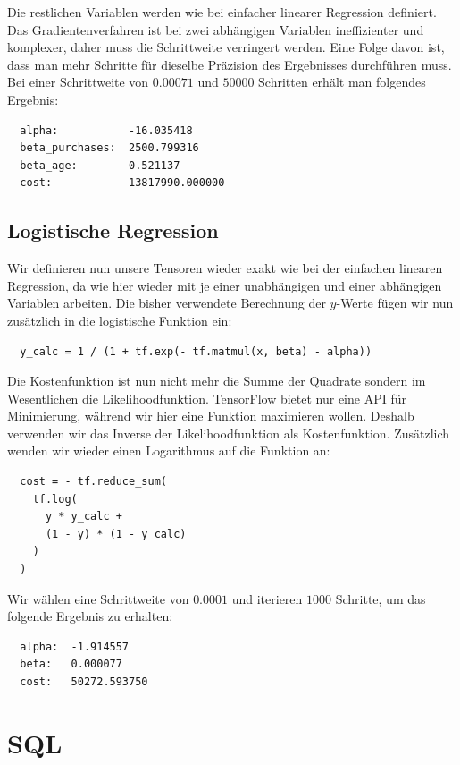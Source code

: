 Die restlichen Variablen werden wie bei einfacher linearer Regression definiert. Das Gradientenverfahren ist bei zwei abhängigen Variablen ineffizienter und komplexer, daher muss die Schrittweite verringert werden. Eine Folge davon ist, dass man mehr Schritte für dieselbe Präzision des Ergebnisses durchführen muss. Bei einer Schrittweite von $0.00071$ und $50000$ Schritten erhält man folgendes Ergebnis:

\begin{lstlisting}
  alpha:           -16.035418
  beta_purchases:  2500.799316
  beta_age:        0.521137
  cost:            13817990.000000
\end{lstlisting}

\subsection{Logistische Regression}

Wir definieren nun unsere Tensoren wieder exakt wie bei der einfachen linearen Regression, da wie hier wieder mit je einer unabhängigen und einer abhängigen Variablen arbeiten. Die bisher verwendete Berechnung der $y$-Werte fügen wir nun zusätzlich in die logistische Funktion ein:

\begin{lstlisting}
  y_calc = 1 / (1 + tf.exp(- tf.matmul(x, beta) - alpha))
\end{lstlisting}

Die Kostenfunktion ist nun nicht mehr die Summe der Quadrate sondern im Wesentlichen die Likelihoodfunktion. TensorFlow bietet nur eine API für Minimierung, während wir hier eine Funktion maximieren wollen. Deshalb verwenden wir das Inverse der Likelihoodfunktion als Kostenfunktion. Zusätzlich wenden wir wieder einen Logarithmus auf die Funktion an:

\begin{lstlisting}
  cost = - tf.reduce_sum(
    tf.log(
      y * y_calc +
      (1 - y) * (1 - y_calc)
    )
  )
\end{lstlisting}

Wir wählen eine Schrittweite von $0.0001$ und iterieren $1000$ Schritte, um das folgende Ergebnis zu erhalten:

\begin{lstlisting}
  alpha:  -1.914557
  beta:   0.000077
  cost:   50272.593750
\end{lstlisting}

\section{SQL}

